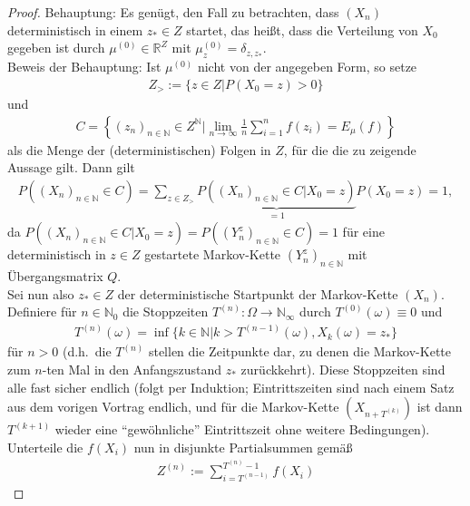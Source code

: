 \documentclass[twoside]{article}
\theoremstyle{definition}
\begin{document}
\begin{proof}
Behauptung: Es genügt, den Fall zu betrachten, dass $(X_n)$ deterministisch in einem $z_* \in Z$ startet, das heißt, dass die Verteilung von $X_0$ gegeben ist durch $\mu^{(0)} \in \mathbb{R}^Z$ mit $\mu^{(0)}_z = \delta_{z,z_*}$.\\
Beweis der Behauptung: Ist $\mu^{(0)}$ nicht von der angegeben Form, so setze
\begin{align}
Z_> := \{z \in Z | P(X_0 = z)>0\}
\end{align}
und 
\begin{align}
C = \left\{ (z_n)_{n \in \mathbb{N}} \in Z^{\mathbb{N}} \mathrel{\Big|} \lim_{n \to \infty} \frac{1}{n} \sum_{i=1}^n f(z_i) = E_\mu(f) \right\}
\end{align}
als die Menge der (deterministischen) Folgen in $Z$, für die die zu zeigende Aussage gilt. Dann gilt
\begin{align}
P((X_n)_{n \in \mathbb{N}} \in C) = \sum_{z \in Z_>} \underbrace{P((X_n)_{n \in \mathbb{N}} \in C | X_0 = z)}_{=1} P(X_0 = z) = 1,
\end{align}
da $P((X_n)_{n \in \mathbb{N}} \in C | X_0 = z) = P((Y_n^z)_{n \in \mathbb{N}} \in C) = 1$ für eine deterministisch in $z \in Z$ gestartete Markov-Kette $(Y_n^z)_{n \in \mathbb{N}}$ mit Übergangsmatrix $Q$.\\
Sei nun also $z_* \in Z$ der deterministische Startpunkt der Markov-Kette $(X_n)$. Definiere für $n \in \mathbb{N}_0$ die Stoppzeiten $T^{(n)}:\Omega\to \mathbb{N}_\infty$ durch $T^{(0)}(\omega) \equiv 0$ und 
\begin{align}
T^{(n)}(\omega) = \inf\{k \in \mathbb{N} | k > T^{(n-1)}(\omega),X_k(\omega)=z_* \}
\end{align}
für $n >0$ (d.h.\ die $T^{(n)}$ stellen die Zeitpunkte dar, zu denen die Markov-Kette zum $n$-ten Mal in den Anfangszustand $z_*$ zurückkehrt). Diese Stoppzeiten sind alle fast sicher endlich (folgt per Induktion; Eintrittszeiten sind nach einem Satz aus dem vorigen Vortrag endlich, und für die Markov-Kette $(X_{n + T^{(k)}})$ ist dann $T^{(k+1)}$ wieder eine \enquote{gewöhnliche} Eintrittszeit ohne weitere Bedingungen). Unterteile die $f(X_i)$ nun in disjunkte Partialsummen gemäß
\begin{align}
Z^{(n)} := \sum_{i = T^{(n-1)}}^{T^{(n)}-1} f(X_i)
\end{align}

\end{proof}
\end{document}
